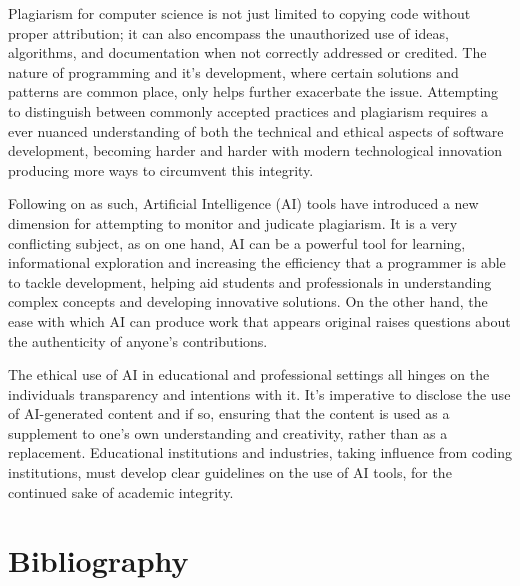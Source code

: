 \documentclass{article}
\begin{document}
Plagiarism for computer science is not just limited to copying code without proper attribution; it can also encompass the unauthorized use of ideas, algorithms, and documentation when not correctly addressed or credited. The nature of programming and it's development, where certain solutions and patterns are common place, only helps further exacerbate the issue. Attempting to distinguish between commonly accepted practices and plagiarism requires a ever nuanced understanding of both the technical and ethical aspects of software development, becoming harder and harder with modern technological innovation producing more ways to circumvent this integrity.\\\vspace{0.3cm}

Following on as such, Artificial Intelligence (AI) tools have introduced a new dimension for attempting to monitor and judicate plagiarism. It is a very conflicting subject, as on one hand, AI can be a powerful tool for learning, informational exploration and increasing the efficiency that a programmer is able to tackle development, helping aid students and professionals in understanding complex concepts and developing innovative solutions. On the other hand, the ease with which AI can produce work that appears original raises questions about the authenticity of anyone's contributions.\\\vspace{0.3cm}

The ethical use of AI in educational and professional settings all hinges on the individuals transparency and intentions with it. It's imperative to disclose the use of AI-generated content and if so, ensuring that the content is used as a supplement to one's own understanding and creativity, rather than as a replacement. Educational institutions and industries, taking influence from coding institutions, must develop clear guidelines on the use of AI tools, for the continued sake of academic integrity.\\\vspace{0.3cm}



\newpage
\section{Bibliography}
\end{document}
